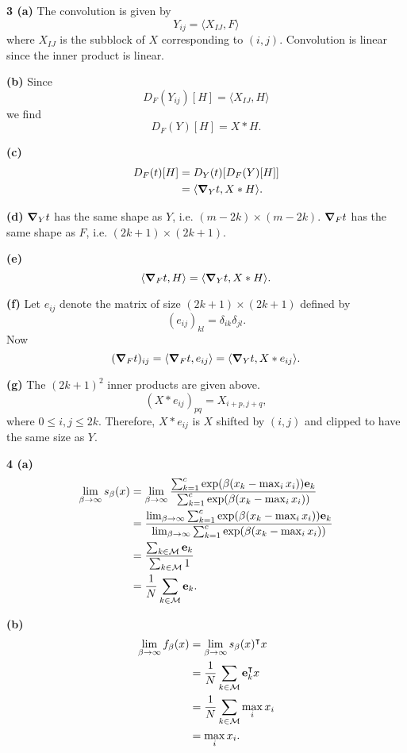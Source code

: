 \documentclass{article}
\makeatletter
\newcommand*{\shifttext}[1]{%
  \settowidth{\@tempdima}{#1}%
  \hspace{-\@tempdima}#1%
}
\newcommand{\plabel}[1]{%
\shifttext{\textbf{#1}\quad}%
}
\newcommand{\prule}{%
\begin{center}%
\hdashrule[0.5ex]{.99\linewidth}{1pt}{1pt 2.5pt}%
\end{center}%
}
\newcommand{\minusbaseline}{\abovedisplayskip=0pt\abovedisplayshortskip=0pt~\vspace*{-\baselineskip}}%
\makeatother
\begin{document}
\prule

\plabel{3 (a)}%
The convolution is given by
\[ Y_{ij} = \langle X_{IJ}, F \rangle \]
where $X_{IJ}$ is the subblock of $X$ corresponding to $(i,j)$.
Convolution is linear since the inner product is linear.

\plabel{(b)}%
Since
\[ D_F(Y_{ij})[H] = \langle X_{IJ}, H \rangle \]
we find
\[ D_F(Y)[H] = X * H. \]

\plabel{(c)}%
\begingroup\minusbaseline
\begin{align*}
    D_F(t)[H] &= D_Y(t)[D_F(Y)[H]] \\
    &= \langle \grad_Y t, X * H \rangle.
\end{align*}
\endgroup

\plabel{(d)}%
$\grad_Y t$ has the same shape as $Y$, i.e. $(m-2k)\times (m-2k)$.
$\grad_F t$ has the same shape as $F$, i.e. $(2k+1)\times (2k+1)$.

\plabel{(e)}%
\begingroup\minusbaseline
\[ \langle \grad_F t, H \rangle = \langle \grad_Y t, X * H \rangle. \]
\endgroup

\plabel{(f)}%
Let $e_{ij}$ denote the matrix of size $(2k+1)\times (2k+1)$ defined by
\[ (e_{ij})_{kl} = \delta_{ik} \delta_{jl}. \]
Now
\[ (\grad_F t)_{ij} = \langle \grad_F t, e_{ij} \rangle = \langle \grad_Y t, X * e_{ij} \rangle. \]

\plabel{(g)}%
The $(2k+1)^2$ inner products are given above.
\[ (X * e_{ij})_{pq} = X_{i+p,j+q}, \]
where $0\le i,j \le 2k$.
Therefore, $X * e_{ij}$ is $X$ shifted by $(i,j)$ and clipped to have the same size as $Y$.

\prule

\plabel{4 (a)}%
\begingroup\minusbaseline
\begin{align*}
    \lim_{\beta\rightarrow\infty} s_\beta(x) &= \lim_{\beta\rightarrow\infty} \frac{\sum_{k=1}^c \exp(\beta (x_k - \max_i x_i)) \vb{e}_k}{\sum_{k=1}^c \exp(\beta(x_k - \max_i x_i))} \\
    &= \frac{\lim_{\beta\rightarrow\infty}\sum_{k=1}^c \exp(\beta (x_k - \max_i x_i)) \vb{e}_k}{\lim_{\beta\rightarrow\infty}\sum_{k=1}^c \exp(\beta(x_k - \max_i x_i))} \\
    &= \frac{\sum_{k\in\mathcal{M}} \vb{e}_k}{\sum_{k\in\mathcal{M}} 1} \\
    &= \frac{1}{N}\sum_{k\in\mathcal{M}} \vb{e}_k.
\end{align*}
\endgroup

\plabel{(b)}%
\begingroup\minusbaseline
\begin{align*}
    \lim_{\beta\rightarrow\infty} f_\beta(x) &= \lim_{\beta\rightarrow\infty} s_\beta(x)^\intercal x \\
    &= \frac{1}{N}\sum_{k\in\mathcal{M}} \vb{e}_k^\intercal x \\
    &= \frac{1}{N}\sum_{k\in\mathcal{M}} \max_i x_i \\
    &= \max_i x_i.
\end{align*}
\endgroup
\end{document}
